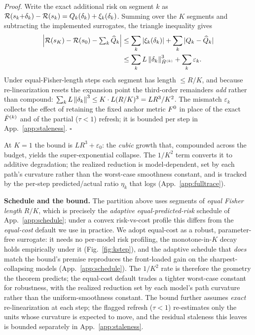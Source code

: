 \noindent\emph{Proof.} Write the exact additional risk on segment $k$ as
$\mathcal{R}(s_k{+}\delta_k)-\mathcal{R}(s_k)=Q_k(\delta_k)+\xi_k(\delta_k)$. Summing over the $K$ segments and
subtracting the implemented surrogates, the triangle inequality gives
\[
\begin{aligned}
\Big|\mathcal{R}(s_K)-\mathcal{R}(s_0)-\textstyle\sum_k\widehat Q_k\Big|
&\le\sum_k|\xi_k(\delta_k)|+\sum_k|Q_k-\widehat Q_k| \\
&\le\sum_k L\left\lVert \delta_k \right\rVert_{\bar{H}^{(k)}}^3+\sum_k\varepsilon_k .
\end{aligned}
\]
Under equal-Fisher-length steps each segment has length $\le R/K$, and because re-linearization resets the
expansion point the third-order remainders \emph{add} rather than compound:
$\sum_k L\left\lVert \delta_k \right\rVert^3\le K\cdot L(R/K)^3=LR^3/K^2$. The mismatch $\varepsilon_k$ collects the effect of
retaining the fixed anchor metric $F^0$ in place of the exact $\bar{F}^{(k)}$ and of the partial
($\tau{<}1$) refresh; it is bounded per step in App.~\ref{app:staleness}. \hfill$\square$

\smallskip\noindent At $K{=}1$ the bound is $LR^3+\varepsilon_0$: the \emph{cubic} growth that, compounded
across the budget, yields the super-exponential collapse. The $1/K^2$ term converts it to additive
degradation; the realized reduction is model-dependent, set by each path's curvature rather than the
worst-case smoothness constant, and is tracked by the per-step predicted/actual ratio $\eta_k$ that
\method logs (App.~\ref{app:fulltrace}).

\textbf{Schedule and the bound.} The partition above uses segments of \emph{equal Fisher length} $R/K$,
which is precisely the \emph{adaptive equal-predicted-risk} schedule of App.~\ref{app:schedule}; under a
convex risk-vs-cost profile this differs from the \emph{equal-cost} default we use in practice. We adopt
equal-cost as a robust, parameter-free surrogate: it needs no per-model risk profiling, the monotone-in-$K$
decay holds empirically under it (Fig.~\ref{fig:kstep}), and the adaptive schedule that \emph{does} match
the bound's premise reproduces the front-loaded gain on the sharpest-collapsing models
(App.~\ref{app:schedule}). The $1/K^2$ rate is therefore the geometry the theorem predicts; the equal-cost
default trades a tighter worst-case constant for robustness, with the realized reduction set by each
model's path curvature rather than the uniform-smoothness constant. The bound further assumes \emph{exact}
re-linearization at each step; the flagged refresh ($\tau{<}1$) re-estimates only the units whose curvature
is expected to move, and the residual staleness this leaves is bounded separately in
App.~\ref{app:staleness}.

